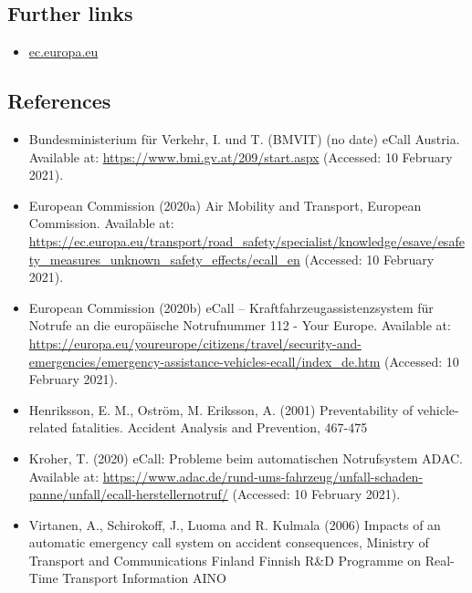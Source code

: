 \documentclass[
]{book}
\providecommand{\tightlist}{%
  \setlength{\itemsep}{0pt}\setlength{\parskip}{0pt}}
\begin{document}
\hypertarget{further-links-12}{%
\subsection*{Further links}\label{further-links-12}}

\begin{itemize}
\tightlist
\item
  \href{https://ec.europa.eu/transport/road_safety/specialist/knowledge/esave/esafety_measures_unknown_safety_effects/ecall_en}{ec.europa.eu}
\end{itemize}

\hypertarget{references-15}{%
\subsection*{References}\label{references-15}}

\begin{itemize}
\tightlist
\item
  Bundesministerium für Verkehr, I. und T. (BMVIT) (no date) eCall Austria. Available at: \url{https://www.bmi.gv.at/209/start.aspx} (Accessed: 10 February 2021).
\item
  European Commission (2020a) Air \textbar{} Mobility and Transport, European Commission. Available at: \url{https://ec.europa.eu/transport/road_safety/specialist/knowledge/esave/esafety_measures_unknown_safety_effects/ecall_en} (Accessed: 10 February 2021).
\item
  European Commission (2020b) eCall -- Kraftfahrzeugassistenzsystem für Notrufe an die europäische Notrufnummer 112 - Your Europe. Available at: \url{https://europa.eu/youreurope/citizens/travel/security-and-emergencies/emergency-assistance-vehicles-ecall/index_de.htm} (Accessed: 10 February 2021).
\item
  Henriksson, E. M., Oström, M. Eriksson, A. (2001) Preventability of vehicle-related fatalities. Accident Analysis and Prevention, 467-475
\item
  Kroher, T. (2020) eCall: Probleme beim automatischen Notrufsystem \textbar{} ADAC. Available at: \url{https://www.adac.de/rund-ums-fahrzeug/unfall-schaden-panne/unfall/ecall-herstellernotruf/} (Accessed: 10 February 2021).
\item
  Virtanen, A., Schirokoff, J., Luoma and R. Kulmala (2006) Impacts of an automatic emergency call system on accident consequences, Ministry of Transport and Communications Finland Finnish R\&D Programme on Real-Time Transport Information AINO
\end{itemize}
\end{document}

